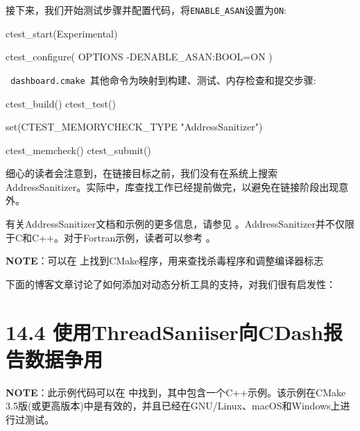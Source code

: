 
接下来，我们开始测试步骤并配置代码，将\texttt{ENABLE\_ASAN}设置为\texttt{ON}:

\begin{codebox}[cmake]
ctest_start(Experimental)

ctest_configure(
  OPTIONS
    -DENABLE_ASAN:BOOL=ON
  )
\end{codebox}

\texttt{ dashboard.cmake }其他命令为映射到构建、测试、内存检查和提交步骤:

\begin{codebox}[cmake]
ctest_build()
ctest_test()

set(CTEST_MEMORYCHECK_TYPE "AddressSanitizer")

ctest_memcheck()
ctest_submit()
\end{codebox}


细心的读者会注意到，在链接目标之前，我们没有在系统上搜索AddressSanitizer。实际中，库查找工作已经提前做完，以避免在链接阶段出现意外。

有关AddressSanitizer文档和示例的更多信息，请参见 。AddressSanitizer并不仅限于C和C++。对于Fortran示例，读者可以参考  。

\begin{myInfoBox}
\textbf{NOTE}：可以在 上找到CMake程序，用来查找杀毒程序和调整编译器标志
\end{myInfoBox}

下面的博客文章讨论了如何添加对动态分析工具的支持，对我们很有启发性：


\section{14.4 使用ThreadSaniiser向CDash报告数据争用}

\begin{myInfoBox}
\textbf{NOTE}：此示例代码可以在  中找到，其中包含一个C++示例。该示例在CMake 3.5版(或更高版本)中是有效的，并且已经在GNU/Linux、macOS和Windows上进行过测试。
\end{myInfoBox}

